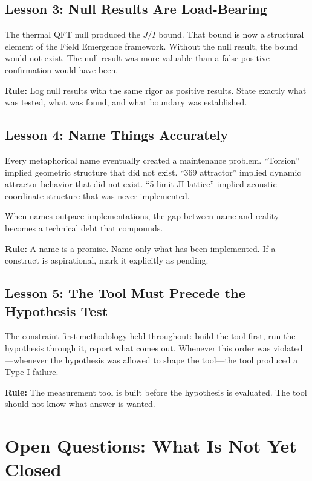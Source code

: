 \documentclass[11pt]{article}
\begin{document}
\subsection{Lesson 3: Null Results Are Load-Bearing}

The thermal QFT null produced the $J/I$ bound. That bound is now a structural element of the Field Emergence framework. Without the null result, the bound would not exist. The null result was more valuable than a false positive confirmation would have been.

\textbf{Rule:} Log null results with the same rigor as positive results. State exactly what was tested, what was found, and what boundary was established.

\subsection{Lesson 4: Name Things Accurately}

Every metaphorical name eventually created a maintenance problem. ``Torsion'' implied geometric structure that did not exist. ``369 attractor'' implied dynamic attractor behavior that did not exist. ``5-limit JI lattice'' implied acoustic coordinate structure that was never implemented.

When names outpace implementations, the gap between name and reality becomes a technical debt that compounds.

\textbf{Rule:} A name is a promise. Name only what has been implemented. If a construct is aspirational, mark it explicitly as pending.

\subsection{Lesson 5: The Tool Must Precede the Hypothesis Test}

The constraint-first methodology held throughout: build the tool first, run the hypothesis through it, report what comes out. Whenever this order was violated---whenever the hypothesis was allowed to shape the tool---the tool produced a Type I failure.

\textbf{Rule:} The measurement tool is built before the hypothesis is evaluated. The tool should not know what answer is wanted.

\section{Open Questions: What Is Not Yet Closed}
\label{sec:open}
\end{document}
